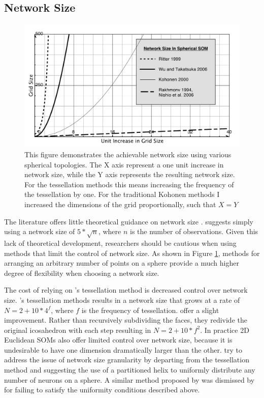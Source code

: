 \documentclass[10pt,titlepage]{article}
\begin{document}
\subsection{Network Size}
\begin{figure}
\centering
\includegraphics[width=\linewidth]{networkSize.pdf}
\caption{This figure demonstrates the achievable network size using various
spherical topologies.  The X axis represent a one unit increase in network size,
while the Y axis represents the resulting network size.
For the tessellation methods this means increasing the frequency of the tessellation
by one.  For the traditional Kohonen methods I increased the dimensions of the
grid proportionally, such that $X=Y$}
\label{fig:nSize}
\end{figure}
The literature offers little theoretical guidance on network size
\citep{cho1996}.  \cite{toolbox} suggests simply using a network size of
\(5*\sqrt {n}\), where \(n\) is the number of observations. Given this lack of
theoretical development, researchers should be cautious when using methods that
limit the control of network size.  As shown in Figure \ref{fig:nSize},
methods for arranging an arbitrary number of points on a sphere provide a much
higher degree of flexibility when choosing a network size.

The cost of relying on \citeauthor{ritter99}'s tessellation method is decreased
control over network size. \citeauthor{ritter99}'s tessellation methods results
in a network size that grows at a rate of \(N=2+10*4^f\), where $f$ is the
frequency of tessellation. \cite{wu2006} offer a slight improvement. Rather than
recursively subdividing the faces, they redivide the original icosahedron with
each step resulting in \(N=2+10*f^2\).  In practice 2D Euclidean SOMs also offer
limited control over network size, because it is undesirable to have one dimension
dramatically larger than the other.  \cite{Nishio:2006fk} try to address the
issue of network size granularity by departing from the tessellation method and
suggesting the use of a partitioned helix to uniformly distribute any number of
neurons on a sphere.  A similar method proposed by \cite{Rakhmanov94} was
dismissed by \cite{wu2005} for failing to satisfy the uniformity conditions
described above.
\end{document}
